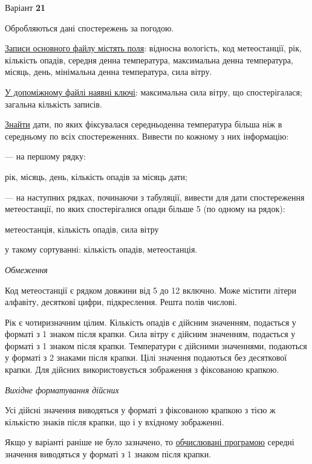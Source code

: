 \documentclass[11pt, ukrainian]{article}
\begin{document}
\par
\newpage
{\center Варіант  \No \textbf { 21 }\par}
\bigskip
Обробляються дані спостережень за погодою. 

\underline{Записи основного файлу містять поля}: відносна вологість, код метеостанції, рік, кількість опадів, середня денна температура, максимальна денна температура, місяць, день, мінімальна денна температура, сила вітру.

\underline{У допоміжному файлі наявні ключі}: максимальна сила вітру, що спостерігалася; загальна кількість записів.

\underline{Знайти} дати, по яких фіксувалася середньоденна температура більша ніж в середньому по всіх спостереженнях. Вивести по кожному з них інформацію:\par
{\noindent}--- на першому рядку:\par
рік, місяць, день, кількість опадів за місяць дати;

{\noindent}--- на наступних рядках, починаючи з табуляції, вивести для дати спостереження метеостанції, по яких спостерігалися опади більше 5 (по одному на рядок):\par
метеостанція, кількість опадів, сила вітру

{\noindent}у такому сортуванні: кількість опадів, метеостанція.


\bigskip\textit{Обмеження}

Код метеостанції є рядком довжини від 5 до 12 включно.
Може містити літери алфавіту, десяткові цифри, підкреслення. Решта полів числові.

Рік є чотиризначним цілим.
Кількість опадів є дійсним значенням, подається у форматі з 1 знаком після крапки.
Сила вітру є дійсним значенням, подається у форматі з 1 знаком після крапки.
Температури є дійсними значеннями, подаються у форматі з 2 знаками після крапки.
Цілі значення подаються без десяткової крапки.
Для дійсних використовується зображення з фіксованою крапкою.

\textit{Вихідне форматування дійсних}

Усі дійсні значення виводяться у форматі з фіксованою крапкою з тією ж кількістю знаків після крапки, що і у вхідному зображенні.

Якщо у варіанті раніше не було зазначено, то \underline{обчислювані програмою} середні значення виводяться у форматі з 1 знаком після крапки.
\end{document}
